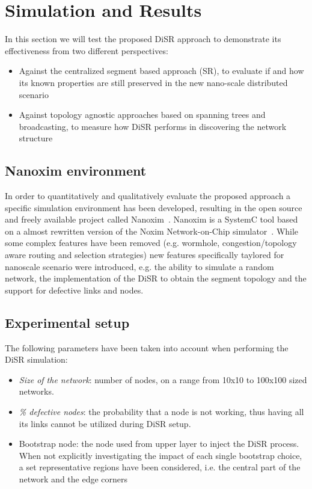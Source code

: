 
\section{Simulation and Results}

In this section we will test the proposed DiSR approach to demonstrate
its effectiveness from two different perspectives:
\begin{itemize}
\item Against the centralized segment based approach (SR), to evaluate
if and how its known properties are still preserved in the new nano-scale distributed scenario
\item Against topology agnostic approaches based on spanning
trees and broadcasting, to measure how DiSR performs in discovering
the network structure 
\end{itemize}

\subsection{Nanoxim environment}

In order to quantitatively and qualitatively evaluate the proposed approach a
specific simulation environment has been developed, resulting in
the open source and freely available project called
Nanoxim~\cite{nanoxim}.
Nanoxim is a SystemC tool based on a almost rewritten
version of the Noxim Network-on-Chip simulator~\cite{noxim}. While some
complex features have been removed (e.g. wormhole, congestion/topology
aware routing and selection strategies) new features specifically
taylored for nanoscale scenario were introduced, e.g. the ability to simulate a random
network, the implementation of the DiSR to obtain the segment topology
and the support for defective links and nodes.

\subsection{Experimental setup}
The following parameters have been taken into account when
performing the DiSR simulation:
\begin{itemize}
\item {\emph{Size of the network}}: number of nodes, on a
range from 10x10 to 100x100 sized networks. 
\item {\emph{\% defective nodes}}: the probability that a node is not
working, thus having all its links cannot be utilized during DiSR setup.  
\item {Bootstrap node}: the node used from upper layer 
to inject the DiSR process. When not explicitly investigating the
impact of each single bootstrap choice, a set representative regions have been
considered, i.e. the central part of the network and the edge corners
\end{itemize}

